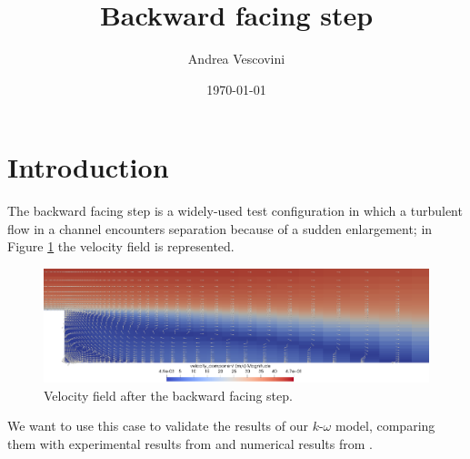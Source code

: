 \documentclass[11pt, a4paper]{article}
\title{\textbf{Backward facing step}}
\author{Andrea Vescovini}
\date{\today}
\theoremstyle{definition}
\begin{document}
	\maketitle
	
\section{Introduction}
The backward facing step is a widely-used test configuration in which a 
turbulent flow in a channel encounters separation because of a sudden 
enlargement; in Figure \ref{fig:bfs_glimphs} the velocity field is represented.
\begin{figure}[h]
	\centering
	\includegraphics[width=\textwidth]{bfs_glimphs}
	\caption{Velocity field after the backward facing step.}
	\label{fig:bfs_glimphs}
\end{figure}
We want to use this case to validate the results of our 
$k\text{-}\omega$ model, comparing them with experimental results from 
\cite{driver} and numerical results from \cite{sitonasa}.
\end{document}
